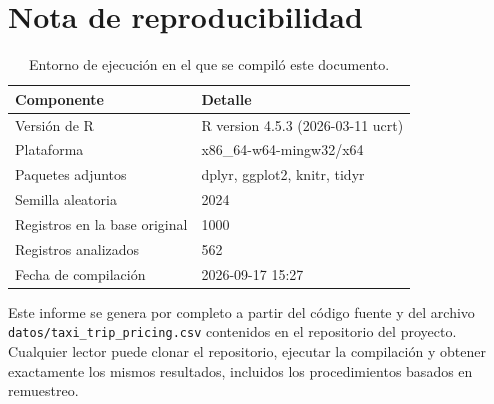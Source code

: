 \documentclass[
]{book}
\begin{document}
\section{Nota de reproducibilidad}\label{nota-de-reproducibilidad}

\begin{table}

\caption{\label{tab:sesion}Entorno de ejecución en el que se compiló este documento.}
\centering
\begin{tabular}[t]{l|l}
\hline
Componente & Detalle\\
\hline
Versión de R & R version 4.5.3 (2026-03-11 ucrt)\\
\hline
Plataforma & x86\_64-w64-mingw32/x64\\
\hline
Paquetes adjuntos & dplyr, ggplot2, knitr, tidyr\\
\hline
Semilla aleatoria & 2024\\
\hline
Registros en la base original & 1000\\
\hline
Registros analizados & 562\\
\hline
Fecha de compilación & 2026-09-17 15:27\\
\hline
\end{tabular}
\end{table}

Este informe se genera por completo a partir del código fuente y del archivo
\texttt{datos/taxi\_trip\_pricing.csv} contenidos en el repositorio del proyecto. Cualquier lector
puede clonar el repositorio, ejecutar la compilación y obtener exactamente los mismos
resultados, incluidos los procedimientos basados en remuestreo.


\end{document}
